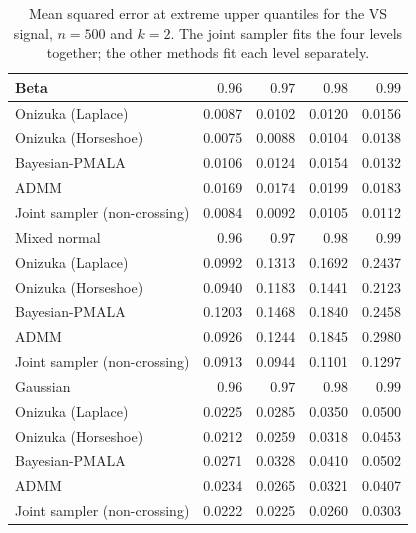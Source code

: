 \begin{table}[!htbp]
\centering
\small
\caption{Mean squared error at extreme upper quantiles for the VS signal, $n=500$ and $k=2$. The joint sampler fits the four levels together; the other methods fit each level separately.}
\label{tab:vs_ext_upper_mse}
\begin{tabular}{lrrrr}
\toprule
Beta & $0.96$ & $0.97$ & $0.98$ & $0.99$ \\
\midrule
Onizuka (Laplace) & 0.0087 & 0.0102 & 0.0120 & 0.0156 \\
Onizuka (Horseshoe) & 0.0075 & 0.0088 & 0.0104 & 0.0138 \\
Bayesian-PMALA & 0.0106 & 0.0124 & 0.0154 & 0.0132 \\
ADMM & 0.0169 & 0.0174 & 0.0199 & 0.0183 \\
Joint sampler (non-crossing) & 0.0084 & 0.0092 & 0.0105 & 0.0112 \\
\midrule
Mixed normal & $0.96$ & $0.97$ & $0.98$ & $0.99$ \\
\midrule
Onizuka (Laplace) & 0.0992 & 0.1313 & 0.1692 & 0.2437 \\
Onizuka (Horseshoe) & 0.0940 & 0.1183 & 0.1441 & 0.2123 \\
Bayesian-PMALA & 0.1203 & 0.1468 & 0.1840 & 0.2458 \\
ADMM & 0.0926 & 0.1244 & 0.1845 & 0.2980 \\
Joint sampler (non-crossing) & 0.0913 & 0.0944 & 0.1101 & 0.1297 \\
\midrule
Gaussian & $0.96$ & $0.97$ & $0.98$ & $0.99$ \\
\midrule
Onizuka (Laplace) & 0.0225 & 0.0285 & 0.0350 & 0.0500 \\
Onizuka (Horseshoe) & 0.0212 & 0.0259 & 0.0318 & 0.0453 \\
Bayesian-PMALA & 0.0271 & 0.0328 & 0.0410 & 0.0502 \\
ADMM & 0.0234 & 0.0265 & 0.0321 & 0.0407 \\
Joint sampler (non-crossing) & 0.0222 & 0.0225 & 0.0260 & 0.0303 \\
\bottomrule
\end{tabular}
\end{table}

